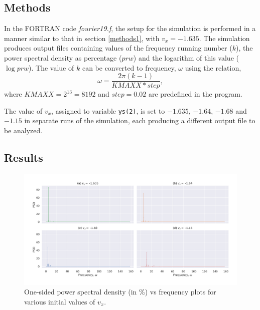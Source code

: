 \documentclass[a4paper]{article}
\begin{document}
	
		\subsection{Methods} \label{methods2}
	
		In the FORTRAN code \emph{fourier19.f}, the setup for the simulation is performed in a manner similar to that in section \ref{methods1}, with \(v_x = -1.635\). The simulation produces output files containing values of the frequency running number (\(k\)), the power spectral density as percentage (\(prw\)) and the logarithm of this value (\(\log{prw}\)). The value of \(k\) can be converted to frequency, \(\omega\) using the relation,
		\begin{equation}
			\omega = \frac{2\pi (k-1)}{KMAXX*step},
			\label{eq:k_to_freq}
		\end{equation} 
		where \(KMAXX = 2^{13} = 8192\) and \(step = 0.02\) are predefined in the program.
		
		The value of \(v_x\), assigned to variable \texttt{ys(2)}, is set to \(-1.635\), \(-1.64\), \(-1.68\) and \(-1.15\) in separate runs of the simulation, each producing a different output file to be analyzed.
		
		
		\subsection{Results} \label{results2}
		
		\begin{figure}
			\includegraphics[width=\columnwidth]{../task2/plots/q1-5_lin.jpg}
			\caption{One-sided power spectral density (in \%) vs frequency plots for various initial values of \(v_x\).}
			\label{fig:task2_lin}
		\end{figure}
		
\end{document}
